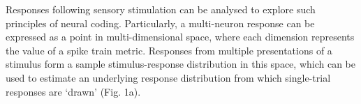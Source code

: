 \documentclass{article}
\begin{document}



Responses following sensory stimulation can be analysed to explore such principles of neural coding. 
Particularly, a multi-neuron response can be expressed as a point in multi-dimensional space, where each dimension represents the value of a spike train metric. Responses from multiple presentations of a stimulus form a sample stimulus-response distribution in this space, which can be used to estimate an underlying response distribution from which single-trial responses are `drawn' (Fig. 1a).
\end{document}
